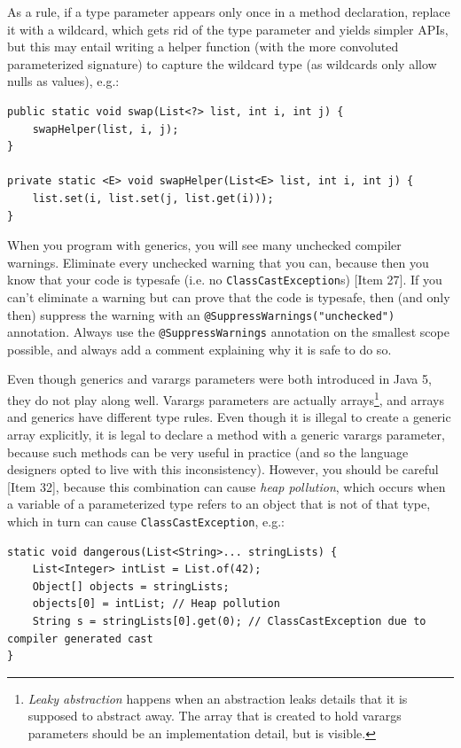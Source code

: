 \documentclass[table, xcdraw]{article}%
\begin{document}
As a rule, if a type parameter appears only once in a method declaration, replace it with
a wildcard, which gets rid of the type parameter and yields simpler APIs, but this may entail writing a helper function (with the more convoluted parameterized signature) to capture the wildcard type (as wildcards only allow nulls as values), e.g.:

\begin{verbatim}
public static void swap(List<?> list, int i, int j) {
    swapHelper(list, i, j);
}

private static <E> void swapHelper(List<E> list, int i, int j) {
    list.set(i, list.set(j, list.get(i)));
}
\end{verbatim}

When you program with generics, you will see many unchecked compiler warnings. Eliminate every unchecked warning that you can, because then you know that your code is typesafe (i.e. no \texttt{ClassCastException}s) [Item 27]. If you can't eliminate a warning but can prove that the code is typesafe, then (and only then) suppress the warning with an \texttt{@SuppressWarnings("unchecked")} annotation. Always use the \texttt{@SuppressWarnings} annotation on the smallest scope possible, and always add a comment explaining why it is safe to do so.

Even though generics and varargs parameters were both introduced in Java 5, they do not play along well. Varargs parameters are actually arrays\footnote{\emph{Leaky abstraction} happens when an abstraction leaks details that it is supposed to abstract away. The array that is created to hold varargs parameters should be an implementation detail, but is visible.}, and arrays and generics have different type rules. Even though it is illegal to create a generic array explicitly, it is legal to declare a method with a generic varargs parameter, because such methods can be very useful in practice (and so the language designers opted to live with this inconsistency). However, you should be careful [Item 32], because this combination can cause \emph{heap pollution}, which occurs when a variable of a parameterized type refers to an object that is not of that type, which in turn can cause \texttt{ClassCastException}, e.g.:

\begin{verbatim}
static void dangerous(List<String>... stringLists) {
    List<Integer> intList = List.of(42);
    Object[] objects = stringLists;
    objects[0] = intList; // Heap pollution
    String s = stringLists[0].get(0); // ClassCastException due to compiler generated cast
}
\end{verbatim}
\end{document}
